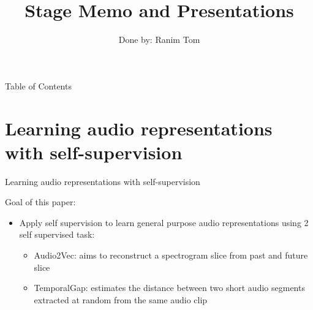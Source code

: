 \documentclass{Beamer}
\title[DEEPEMBED]{Stage Memo and Presentations}
\author{Done by: Ranim Tom}
\date[]
\begin{document}

\begin{frame}
\titlepage
\end{frame}




\begin{frame}{Table of Contents}
\tableofcontents[hideallsubsections]
\end{frame}


\section{Learning audio representations
with self-supervision}





\begin{frame}[t]{Learning audio representations with self-supervision \cite{Audio2Vec}}

Goal of this paper:

\begin{itemize}

\item Apply self supervision to learn general purpose audio representations using 2 self supervised task: 

	\begin{itemize}
	\item Audio2Vec: aims to reconstruct a spectrogram slice from past and future slice  
	
	\item TemporalGap: estimates the distance between two short audio segments extracted at random from the same audio clip
	\end{itemize}


\end{itemize}


\end{frame}
\end{document}
